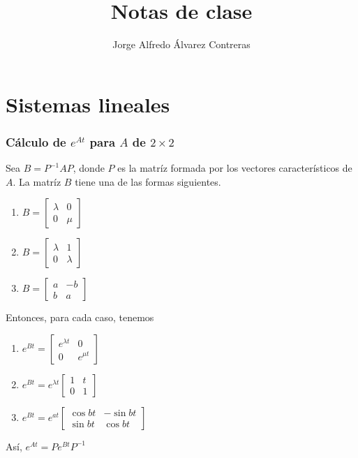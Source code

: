 \documentclass[11pt,letterpaper,draft]{report}
\title{Notas de clase}
\author{Jorge Alfredo Álvarez Contreras}
\newcommand\<{\langle}
\renewcommand\>{\rangle}
\begin{document}
\maketitle

\tableofcontents

\chapter{Sistemas lineales}

\subsection{Cálculo de $e^{At}$ para $A$ de $2\times 2$}

Sea $B=P^{-1}AP$, donde $P$ es la matríz formada por los vectores
característicos de $A$.
La matríz $B$ tiene una de las formas siguientes.

\begin{enumerate}
  \item
  $B=
  \begin{bmatrix}
    \lambda & 0 \\ 0 & \mu
  \end{bmatrix}
  $
  \item
  $B=
  \begin{bmatrix}
    \lambda & 1 \\ 0 & \lambda
  \end{bmatrix}$
  \item
  $B=
  \begin{bmatrix}
    a & -b \\ b & a
  \end{bmatrix}$
\end{enumerate}
Entonces, para cada caso, tenemos
\begin{enumerate}
  \item
  $e^{Bt}=
  \begin{bmatrix}
    e^{\lambda t} & 0 \\ 0 & e^{\mu t}
  \end{bmatrix}
  $
  \item
  $e^{Bt}=
  e^{\lambda t}
  \begin{bmatrix}
    1 & t \\ 0 & 1
  \end{bmatrix}$
  \item
  $e^{Bt}=
  e^{at}
  \begin{bmatrix}
    \cos bt & - \sin bt \\ \sin bt & \cos bt
  \end{bmatrix}$
\end{enumerate}
Así, $e^{At}=Pe^{Bt}P^{-1}$
\end{document}
